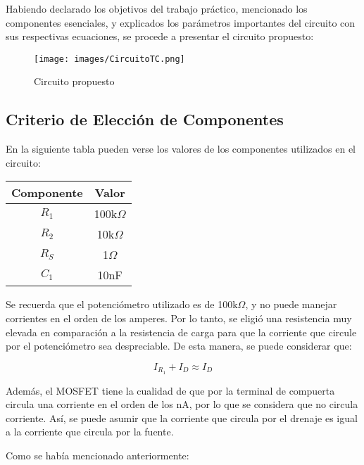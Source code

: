 \documentclass[12pt,oneside,a4paper]{article}
\begin{document}
Habiendo declarado los objetivos del trabajo práctico, mencionado los componentes esenciales, y 
explicados los parámetros importantes del circuito con sus respectivas ecuaciones, se procede a 
presentar el circuito propuesto:

\begin{figure}[H]
    \centering
    \texttt{[image: images/CircuitoTC.png]}
    \caption{Circuito propuesto}
\end{figure}

\subsection*{Criterio de Elección de Componentes}

En la siguiente tabla pueden verse los valores de los componentes utilizados en el circuito:

\begin{table}[H]
    \centering
    \begin{tabular}{|c|c|}
    \hline
    \rowcolor[HTML]{C0C0C0} 
    \textbf{Componente} & \textbf{Valor} \\ \hline
    $R_1$               & 100k$\Omega$     \\ \hline
    $R_2$               & 10k$\Omega$     \\ \hline
    $R_S$               & 1$\Omega$     \\ \hline
    $C_1$               & 10nF     \\ \hline
    \end{tabular}
\end{table}

Se recuerda que el potenciómetro utilizado es de 100k$\Omega$, y no puede manejar corrientes en el orden 
de los amperes. Por lo tanto, se eligió una resistencia muy elevada en comparación a la resistencia de 
carga para que la corriente que circule por el potenciómetro sea despreciable. De esta manera, se puede 
considerar que:

\begin{equation}
    I_{R_1} + I_D \approx I_D
\end{equation}

Además, el MOSFET tiene la cualidad de que por la terminal de compuerta circula una corriente
en el orden de los nA, por lo que se considera que no circula corriente. Así, se puede 
asumir que la corriente que circula por el drenaje es igual a la corriente que circula por la fuente.

Como se había mencionado anteriormente:
\end{document}
